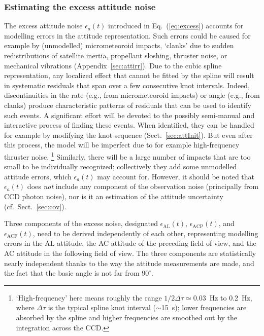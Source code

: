 \documentclass[structabstract]{aa}
\begin{document}
\subsubsection{Estimating the excess attitude noise}\label{sec:attNoise}

The excess attitude noise $\epsilon_a(t)$ introduced in Eq.~(\ref{eq:excess}) 
accounts for modelling errors in the attitude representation. Such errors could be 
caused for example by (unmodelled) micrometeoroid impacts, `clanks' due to 
sudden redistributions of satellite inertia, propellant sloshing, thruster noise, 
or mechanical vibrations (Appendix~\ref{sec:attirr}). 
Due to the cubic spline representation, any localized
effect that cannot be fitted by the spline will result in systematic residuals
that span over a few consecutive knot intervals. Indeed, discontinuities in the 
rate (e.g., from micrometeoroid impacts) or angle (e.g., from clanks) produce
characteristic patterns of residuals that can be used to identify such events.
A significant effort will be devoted to the possibly semi-manual and interactive 
process of finding these events. When identified, they can be handled for example 
by modifying the knot sequence (Sect.~\ref{sec:attInit}). But even after this
process, the model will be imperfect due to for example high-frequency
thruster noise.%
\footnote{`High-frequency' here means roughly the range 
$1/2\Delta\tau\simeq 0.03$~Hz to  0.2~Hz, where $\Delta\tau$ is the
typical spline knot interval ($\sim$15~s); lower frequencies are absorbed
by the spline and higher frequencies are smoothed out by the integration
across the CCD.}
Similarly, there will be a large number of impacts that are too small to be 
individually recognized; collectively they add some unmodelled attitude 
errors, which $\epsilon_a(t)$ may account for. However, it should be noted that 
$\epsilon_a(t)$ does \emph{not} include any component of the observation
noise (principally from CCD photon noise), nor is it an estimation of the 
attitude uncertainty (cf.\ Sect.~\ref{sec:cov}).

Three components of the excess noise, designated $\epsilon_\text{AL}(t)$, 
$\epsilon_\text{ACP}(t)$, and $\epsilon_\text{ACF}(t)$, need to be derived
independently of each other, representing modelling errors in the
AL attitude, the AC attitude of the preceding field of view, and the
AC attitude in the following field of view. The three components
are statistically nearly independent thanks to the way the attitude
measurements are made, and the fact that the basic angle is not far
from $90^\circ$.
\end{document}
